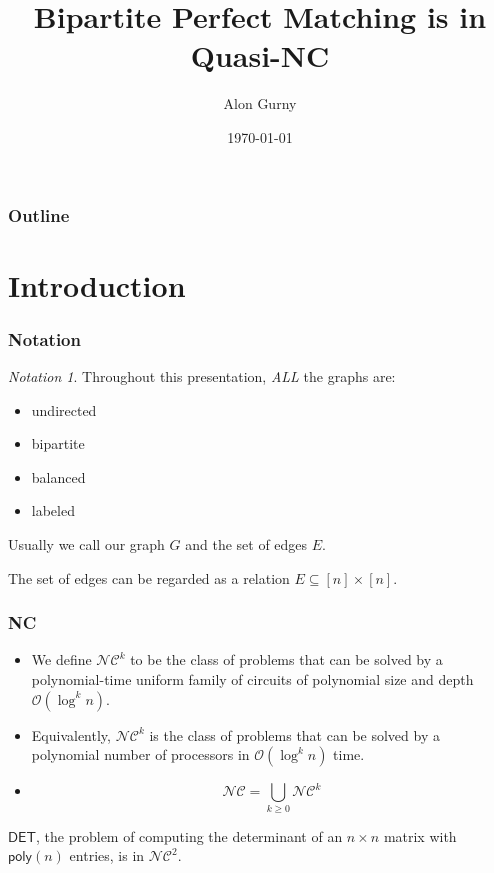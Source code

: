 \documentclass{beamer}
\title{Bipartite Perfect Matching is in Quasi-NC}
\author{Alon Gurny}
\date{\today}
\theoremstyle{remark}
\newtheorem{notation}{Notation}
\newcommand{\nc}{{\mathcal{NC}}}
\newcommand{\OO}{\mathcal{O}}
\begin{document}
\frame{\titlepage}

\begin{frame}
  \frametitle{Outline}
  \tableofcontents
\end{frame}

\section{Introduction}

\begin{frame}
  \frametitle{Notation}

  \begin{notation}
    Throughout this presentation, \emph{ALL} the graphs are:
    \begin{itemize}
      \item undirected
      \item bipartite
      \item balanced
      \item labeled
    \end{itemize}

    Usually we call our graph $G$ and the set of edges $E$.

    The set of edges can be regarded as a relation $E \subseteq [n] \times [n]$.
  \end{notation}
\end{frame}

\begin{frame}
  \frametitle{NC}

  \begin{definition}
    \begin{itemize}
      \item We define $\nc^k$ to be the class of problems that can be solved
            by a polynomial-time uniform family of circuits of polynomial
            size and depth $\OO(\log^k n)$.
      \item Equivalently, $\nc^k$ is the class of problems that can be solved
            by a polynomial number of processors in $\OO(\log^k n)$ time.
      \item \[
              \nc = \bigcup_{k \ge 0} \nc^k
            \]
    \end{itemize}
  \end{definition}

  \begin{fact}
    $\mathsf{DET}$,
    the problem of computing the determinant of an $n \times n$ matrix
    with $\mathsf{poly}(n)$ entries,
    is in $\nc^2$.
  \end{fact}
\end{frame}
\end{document}
